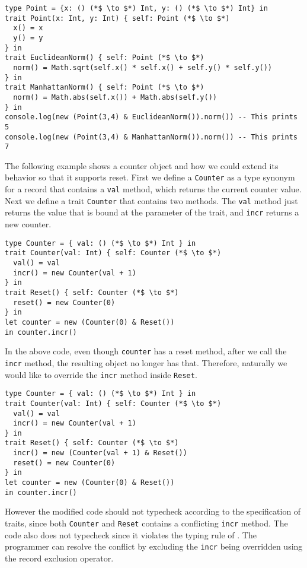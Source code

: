 \begin{lstlisting}
type Point = {x: () (*$ \to $*) Int, y: () (*$ \to $*) Int} in
trait Point(x: Int, y: Int) { self: Point (*$ \to $*)
  x() = x
  y() = y
} in
trait EuclideanNorm() { self: Point (*$ \to $*)
  norm() = Math.sqrt(self.x() * self.x() + self.y() * self.y())
} in
trait ManhattanNorm() { self: Point (*$ \to $*)
  norm() = Math.abs(self.x()) + Math.abs(self.y())
} in
console.log(new (Point(3,4) & EuclideanNorm()).norm()) -- This prints 5
console.log(new (Point(3,4) & ManhattanNorm()).norm()) -- This prints 7
\end{lstlisting}

The following example shows a counter object and how we could extend its
behavior so that it supports reset. First we define a \lstinline$Counter$ as a
type synonym for a record that contains a \lstinline$val$ method, which returns
the current counter value. Next we define a trait \lstinline$Counter$ that
contains two methods. The \lstinline$val$ method just returns the value that is
bound at the parameter of the trait, and \lstinline$incr$ returns a new counter.

\begin{lstlisting}
type Counter = { val: () (*$ \to $*) Int } in
trait Counter(val: Int) { self: Counter (*$ \to $*)
  val() = val
  incr() = new Counter(val + 1)
} in
trait Reset() { self: Counter (*$ \to $*)
  reset() = new Counter(0)
} in
let counter = new (Counter(0) & Reset())
in counter.incr()
\end{lstlisting}

In the above code, even though \lstinline$counter$ has a reset method, after we
call the \lstinline$incr$ method, the resulting object no longer has that.
Therefore, naturally we would like to override the \lstinline$incr$ method
inside \lstinline$Reset$.

\begin{lstlisting}
type Counter = { val: () (*$ \to $*) Int } in
trait Counter(val: Int) { self: Counter (*$ \to $*)
  val() = val
  incr() = new Counter(val + 1)
} in
trait Reset() { self: Counter (*$ \to $*)
  incr() = new (Counter(val + 1) & Reset())
  reset() = new Counter(0)
} in
let counter = new (Counter(0) & Reset())
in counter.incr()
\end{lstlisting}

However the modified code should not typecheck according to the specification of
traits, since both \lstinline$Counter$ and \lstinline$Reset$ contains a
conflicting \lstinline$incr$ method. The code also does not typecheck since it
violates the typing rule of \name. The programmer can resolve the conflict by
excluding the \lstinline$incr$ being overridden using the record exclusion
operator.

